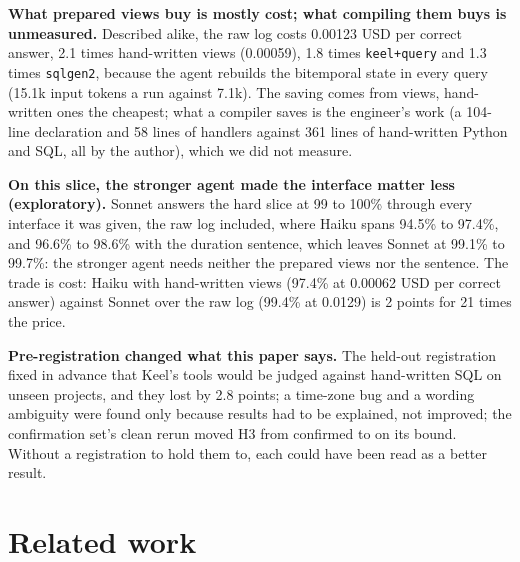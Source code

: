\documentclass[sigconf, nonacm]{acmart}
\newcommand{\code}[1]{\texttt{#1}}
\begin{document}
\textbf{What prepared views buy is mostly cost; what compiling them buys is unmeasured.} Described alike, the raw log costs 0.00123 USD per correct answer, 2.1 times hand-written views (0.00059), 1.8 times \code{keel+query} and 1.3 times \code{sqlgen2}, because the agent rebuilds the bitemporal state in every query (15.1k input tokens a run against 7.1k). The saving comes from views, hand-written ones the cheapest; what a compiler saves is the engineer's work (a 104-line declaration and 58 lines of handlers against 361 lines of hand-written Python and SQL, all by the author), which we did not measure.

\textbf{On this slice, the stronger agent made the interface matter less (exploratory).} Sonnet answers the hard slice at 99 to 100\% through every interface it was given, the raw log included, where Haiku spans 94.5\% to 97.4\%, and 96.6\% to 98.6\% with the duration sentence, which leaves Sonnet at 99.1\% to 99.7\%: the stronger agent needs neither the prepared views nor the sentence. The trade is cost: Haiku with hand-written views (97.4\% at 0.00062 USD per correct answer) against Sonnet over the raw log (99.4\% at 0.0129) is 2 points for 21 times the price.

\textbf{Pre-registration changed what this paper says.} The held-out registration fixed in advance that Keel's tools would be judged against hand-written SQL on unseen projects, and they lost by 2.8 points; a time-zone bug and a wording ambiguity were found only because results had to be explained, not improved; the confirmation set's clean rerun moved H3 from confirmed to on its bound. Without a registration to hold them to, each could have been read as a better result.

\section{Related work}
\label{sec:related}
\end{document}
